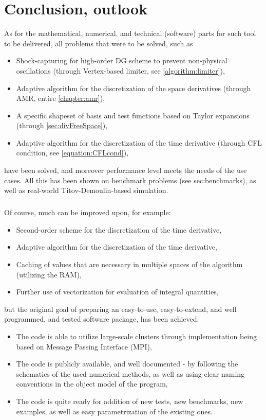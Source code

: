 \chapter{Conclusion, outlook}
As for the mathematical, numerical, and technical (software) parts for such tool to be delivered, all problems that were to be solved, such as
\begin{itemize}
	\item Shock-capturing for high-order DG scheme to prevent non-physical oscillations (through Vertex-based limiter, see \cref{algorithm:limiter}),
	\item Adaptive algorithm for the discretization of the space derivatives (through AMR, entire \cref{chapter:amr}),
	\item A specific shapeset of basis and test functions based on Taylor expansions (through \cref{sec:divFreeSpace}),
	\item Adaptive algorithm for the discretization of the time derivative (through CFL condition, see \cref{equation:CFLcond}),
\end{itemize}
have been solved, and moreover performance level meets the needs of the use cases. All this has been shown on benchmark problems (see {sec:benchmarks}), as well as real-world Titov-Demoulin-based simulation.
\paragraph{}
Of course, much can be improved upon, for example:
\begin{itemize}
	\item Second-order scheme for the discretization of the time derivative,
	\item Adaptive algorithm for the discretization of the time derivative,
	\item Caching of values that are necessary in multiple spaces of the algorithm (utilizing the RAM),
	\item Further use of vectorization for evaluation of integral quantities,
\end{itemize}
but the original goal of preparing an easy-to-use, easy-to-extend, and well programmed, and tested software package, has been achieved:
\begin{itemize}
\item The code is able to utilize large-scale clusters through implementation being based on Message Passing Interface (MPI),
\item The code is publicly available, and well documented - by following the schematics of the used numerical methods, as well as using clear naming conventions in the object model of the program,
\item The code is quite ready for addition of new tests, new benchmarks, new examples, as well as easy parametrization of the existing ones.
\end{itemize}

